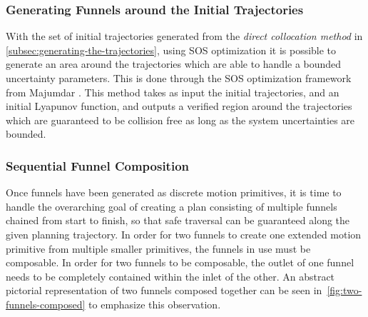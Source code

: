 \subsubsection{Generating Funnels around the Initial Trajectories}
\label{sec:generating-funnels-initial}

With the set of initial trajectories generated from the \textit{direct
  collocation method} in \ref{subsec:generating-the-trajectories}, using SOS
optimization it is possible to generate an area around the trajectories which
are able to handle a bounded uncertainty parameters. This is done through the
SOS optimization framework from Majumdar
\cite{majumdarFunnelLibrariesRealtime2017}. This method takes as input the
initial trajectories, and an initial Lyapunov function, and outputs a verified
region around the trajectories which are guaranteed to be collision free as long
as the system uncertainties are bounded.


\subsubsection{Sequential Funnel Composition}
\label{sec:composable-funnels}


Once funnels have been generated as discrete motion primitives, it is time to
handle the overarching goal of creating a plan consisting of multiple funnels
chained from start to finish, so that safe traversal can be guaranteed along the
given planning trajectory. In order for two funnels to create one extended
motion primitive from multiple smaller primitives, the funnels in use must be
composable. In order for two funnels to be composable, the outlet of one funnel
needs to be completely contained within the inlet of the other. An abstract
pictorial representation of two funnels composed together can be seen
in~\cref{fig:two-funnels-composed} to emphasize this observation.

